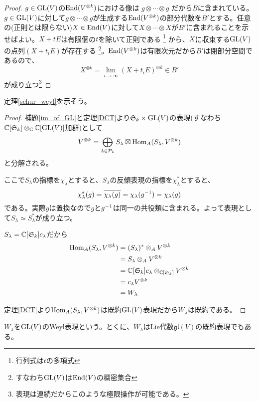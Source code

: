 \documentclass{ltjsreport}
\begin{document}
\begin{proof}
  $g\in\text{GL}(V)$の$\text{End}(V^{\otimes k})$における像は
  $
  g\otimes \cdots\otimes g 
  $
  だから$B$に含まれている。$g\in\text{GL}(V)$に対して$g\otimes \cdots\otimes g$が生成する$\text{End}(V^{\otimes k})$の部分代数を$B'$とする。任意の(正則とは限らない)$X\in\text{End}(V)$に対して$X\otimes \cdots\otimes X$が$B'$に含まれることを示せばよい。$X+tE$は有限個の$t$を除いて正則である
  \footnote{
    行列式は$t$の多項式
  }
  から、$X$に収束する$\text{GL}(V)$の点列$(X+t_iE)$が存在する
  \footnote{
    すなわち$\text{GL}(V)$は$\text{End}(V)$の稠密集合
  }。$\text{End}(V^{\otimes k})$は有限次元だから$B'$は閉部分空間であるので、
  \[
  X^{\otimes k}=\lim_{i\rightarrow\infty}(X+t_iE)^{\otimes k}\in B'  
  \]
  が成り立つ\footnote{
    表現は連続だからこのような極限操作が可能である。
  }
\end{proof}


定理\ref{schur_weyl}を示そう。
\begin{proof}
  補題\ref{im_of_GL}と定理\ref{DCT}より$\mathfrak{S}_k\times\text{GL}(V)$の表現(すなわち$\mathbb{C}[\mathfrak{S}_k]\otimes_{\mathbb{C}}\mathbb{C}[\text{GL}(V)]$加群)として
  \[
  V^{\otimes k}=\bigoplus_{\lambda\in\mathcal{P}_k}S_\lambda\boxtimes \text{Hom}_A(S_\lambda,V^{\otimes k})  
  \]
  と分解される。
  
  ここで$S_\lambda$の指標を$\chi_\lambda$とすると、$S_\lambda$の反傾表現の指標を$\chi^*_\lambda$とすると、
  \[
  \chi^*_\lambda(g)=\overline{\chi_\lambda(g)}=\chi_\lambda(g^{-1})=\chi_\lambda(g)  
  \]
  である。実際$g$は置換なので$g$と$g^{-1}$は同一の共役類に含まれる。よって表現として$S_\lambda\simeq S_\lambda^*$が成り立つ。

  $S_\lambda=\mathbb{C}[\mathfrak{S}_k]c_\lambda$だから
  \begin{align*}
    \text{Hom}_A(S_\lambda,V^{\otimes k})
    &=(S_\lambda)^*\otimes_AV^{\otimes k}\\
    &=S_\lambda\otimes_AV^{\otimes k}\\
    &=\mathbb{C}[\mathfrak{S}_k]c_\lambda\otimes_{\mathbb{C}[\mathfrak{S}_k]}V^{\otimes k}\\
    &=c_\lambda V^{\otimes k}\\
    &=W_\lambda
  \end{align*}

  定理\ref{DCT}より$\text{Hom}_A(S_\lambda,V^{\otimes k})$は既約$\text{GL}(V)$表現だから$W_\lambda$は既約である。
\end{proof}

$W_\lambda$を$\text{GL}(V)$のWeyl表現という。とくに、$W_\lambda$はLie代数$\mathfrak{gl}(V)$の既約表現でもある。
\end{document}
